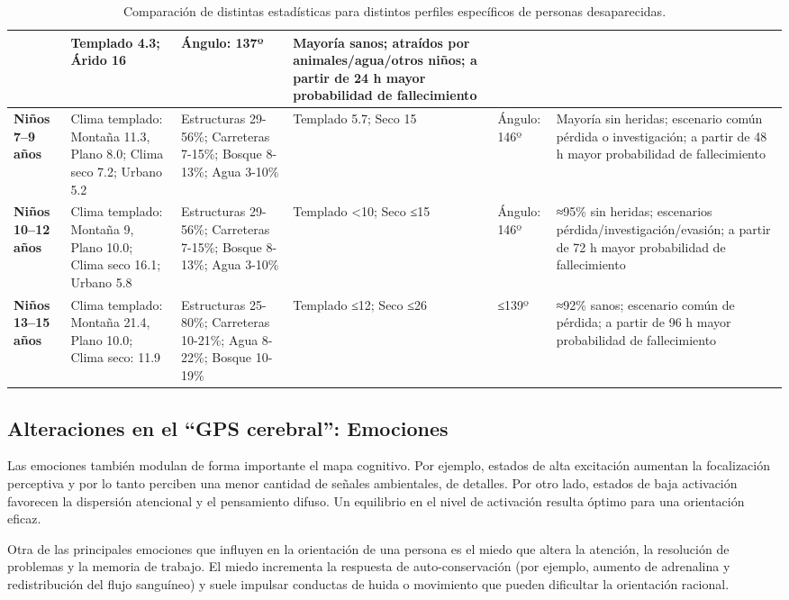 \begin{table}[htbp]
\begin{tabular}{ |m{2cm}|m{2.5cm}|m{3cm}|m{1.8cm}|m{2cm}|m{3.0cm}| }
    & {Templado 4.3; Árido 16} 
    & {Ángulo: 137º} 
    & {Mayoría sanos; atraídos por animales/agua/otros niños; a partir de 24 h mayor probabilidad de fallecimiento} \\
\hline
\cellcolor[HTML]{EFEFEF}\textbf{Niños 7--9 años} 
    & {Clima templado: Montaña 11.3, Plano 8.0; Clima seco 7.2; Urbano 5.2} 
    & {Estructuras 29-56\%; Carreteras 7-15\%; Bosque 8-13\%; Agua 3-10\%} 
    & {Templado 5.7; Seco 15} 
    & {Ángulo: 146º} 
    & {Mayoría sin heridas; escenario común pérdida o investigación; a partir de 48 h mayor probabilidad de fallecimiento} \\
\hline
\cellcolor[HTML]{EFEFEF}\textbf{Niños 10--12 años} 
    & {Clima templado: Montaña 9, Plano 10.0; Clima seco 16.1; Urbano 5.8} 
    & {Estructuras 29-56\%; Carreteras 7-15\%; Bosque 8-13\%; Agua 3-10\%} 
    & {Templado <10; Seco ≤15} 
    & {Ángulo: 146º} 
    & {≈95\% sin heridas; escenarios pérdida/investigación/evasión; a partir de 72 h mayor probabilidad de fallecimiento} \\
\hline
\cellcolor[HTML]{EFEFEF}\textbf{Niños 13--15 años} 
    & {Clima templado: Montaña 21.4, Plano 10.0; Clima seco: 11.9} 
    & {Estructuras 25-80\%; Carreteras 10-21\%; Agua 8-22\%; Bosque 10-19\%} 
    & {Templado ≤12; Seco ≤26} 
    & {≤139º} 
    & {≈92\% sanos; escenario común de pérdida; a partir de 96 h mayor probabilidad de fallecimiento} \\
\hline
\end{tabular}
\caption{Comparación de distintas estadísticas para distintos perfiles específicos de personas desaparecidas. \label{tabla:ComparativaEstadisticasPerfiles}}
\end{table}


\vspace{15cm}
    \subsection{Alteraciones en el ``GPS cerebral'': Emociones}

    Las emociones también modulan de forma importante el mapa cognitivo. Por ejemplo, estados de alta excitación aumentan la focalización perceptiva y por lo tanto perciben una menor cantidad de señales ambientales, de detalles. Por otro lado, estados de baja activación favorecen la dispersión atencional y el pensamiento difuso. Un equilibrio en el nivel de activación resulta óptimo para una orientación eficaz.

    Otra de las principales emociones que influyen en la orientación de una persona es el miedo que altera la atención, la resolución de problemas y la memoria de trabajo. El miedo incrementa la respuesta de auto-conservación (por ejemplo, aumento de adrenalina y redistribución del flujo sanguíneo) y suele impulsar conductas de huida o movimiento que pueden dificultar la orientación racional. 
    
